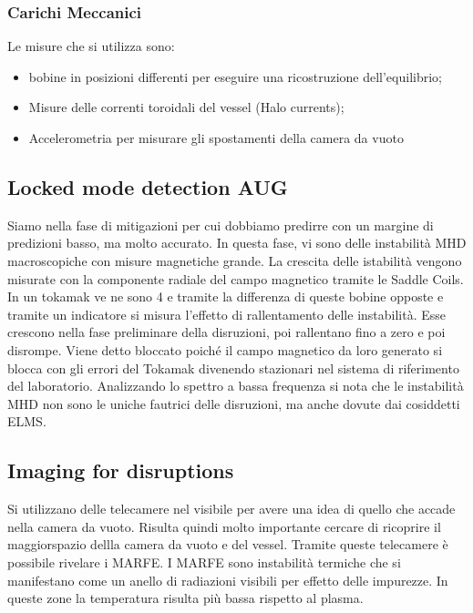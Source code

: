 \documentclass{article}
\begin{document}
\subsubsection{Carichi Meccanici}
Le misure che si utilizza sono:\begin{itemize}
    \item bobine in posizioni differenti per eseguire una ricostruzione dell'equilibrio;
    \item Misure delle correnti toroidali del vessel (Halo currents);
    \item Accelerometria per misurare gli spostamenti della camera da vuoto
\end{itemize}
\subsection{Locked mode detection AUG}
Siamo nella fase di mitigazioni per cui dobbiamo predirre con un margine di predizioni basso, ma molto accurato.\newline
In questa fase, vi sono delle instabilità MHD macroscopiche con misure magnetiche grande. La crescita delle istabilità vengono misurate con la componente radiale del campo magnetico tramite le Saddle Coils. In un tokamak ve ne sono 4 e tramite la differenza di queste bobine opposte e tramite un indicatore si misura l'effetto di rallentamento delle instabilità. Esse crescono nella fase preliminare della disruzioni, poi rallentano fino a zero e poi disrompe. Viene detto bloccato poiché il campo magnetico da loro generato si blocca con gli errori del Tokamak divenendo stazionari nel sistema di riferimento del laboratorio.\newline
Analizzando lo spettro a bassa frequenza si nota che le instabilità MHD non sono le uniche fautrici delle disruzioni, ma anche dovute dai cosiddetti ELMS.%
\subsection{Imaging for disruptions}
Si utilizzano delle telecamere nel visibile per avere una idea di quello che accade nella camera da vuoto. Risulta quindi molto importante cercare di ricoprire il maggiorspazio dellla camera da vuoto e del vessel. Tramite queste telecamere è possibile rivelare i MARFE.\newline
I MARFE sono instabilità termiche che si manifestano come un anello di radiazioni visibili per effetto delle impurezze. In queste zone la temperatura risulta più bassa rispetto al plasma.
\end{document}
